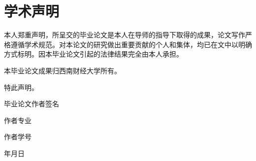 \documentclass{thesisSWUFE}
\begin{document}
\nocite{jing2026esg,wang2015tracking,liu2018lossaverse,wang2021reference,liang2014robust,an2014robust,kang2017cvar,liu2016cvar,htsc2024practice,htsc2025lowrate}
\makecover
\clearpage
\section*{学术声明}
\thispagestyle{empty}
本人郑重声明，所呈交的毕业论文是本人在导师的指导下取得的成果，论文写作严格遵循学术规范。对本论文的研究做出重要贡献的个人和集体，均已在文中以明确方式标明。因本毕业论文引起的法律结果完全由本人承担。

本毕业论文成果归西南财经大学所有。

特此声明。

\vspace{2\baselineskip}
毕业论文作者签名\quad\underline{\hspace{5cm}}

作者专业\quad\underline{\hspace{6cm}}

作者学号\quad\underline{\hspace{6cm}}

\hfill 年\quad 月\quad 日
\end{document}
